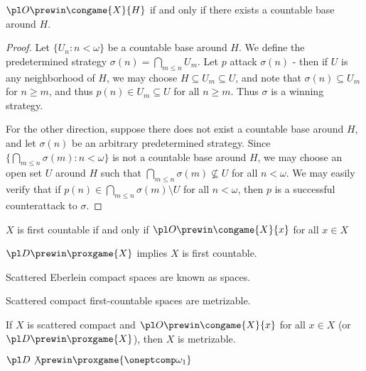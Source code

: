 \newpage

\begin{thm}
  $\pl O \prewin \congame{X}{H}$ if and only if there exists a countable base 
  around $H$.
\end{thm}

\begin{proof}
  Let $\{U_n:n<\omega\}$ be a countable base around $H$. We define the 
  predetermined strategy $\sigma(n)=\bigcap_{m\leq n}U_m$. Let $p$ attack 
  $\sigma(n)$ - then if $U$ is any neighborhood of $H$, we may choose 
  $H\subseteq U_m\subseteq U$, and note that $\sigma(n)\subseteq U_m$ for 
  $n\geq m$, and thus $p(n)\in U_m\subseteq U$ for all $n\geq m$. Thus 
  $\sigma$ is a winning strategy.

  For the other direction, suppose there does not exist a countable base 
  around $H$, and let $\sigma(n)$ be an arbitrary predetermined strategy. 
  Since $\{\bigcap_{m\leq n}\sigma(m):n<\omega\}$ is not a countable base 
  around $H$, we may choose an open set $U$ around $H$ such that 
  $\bigcap_{m\leq n}\sigma(m)\not\subseteq U$ for all $n<\omega$. We may 
  easily verify that if $p(n)\in\bigcap_{m\leq n}\sigma(m)\setminus U$ for 
  all $n<\omega$, then $p$ is a successful counterattack to $\sigma$.
\end{proof}

\begin{cor}
  $X$ is first countable if and only if $\pl O \prewin \congame{X}{x}$ for 
  all $x\in X$
\end{cor}

\begin{cor}
  $\pl D \prewin \proxgame{X}$ implies $X$ is first countable.
\end{cor}

\begin{defn}
  Scattered Eberlein compact spaces are known as  spaces.
\end{defn}

\begin{thm}[folklore]
  Scattered compact first-countable spaces are metrizable.
\end{thm}

\begin{cor}
  If $X$ is scattered compact and $\pl O \prewin\congame{X}{x}$ for all
  $x\in X$ (or $\pl D \prewin\proxgame{X}$), then $X$ is metrizable.
\end{cor}


\begin{ex}
  $\pl D \not\prewin \proxgame{\oneptcomp\omega_1}$
\end{ex}

